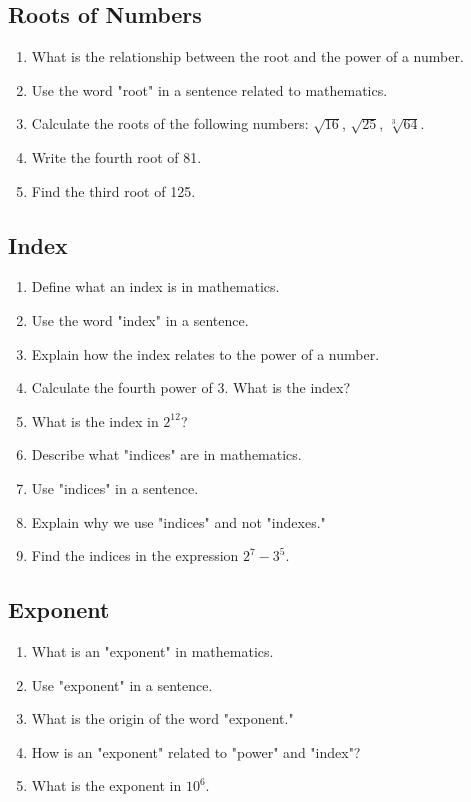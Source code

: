 \documentclass[12pt]{article}
\begin{document}
\begin{enumerate}
\subsection*{Roots of Numbers}
\begin{enumerate}
\item What is the relationship between the root and the power of a number.
\item Use the word "root" in a sentence related to mathematics.
\item Calculate the roots of the following numbers: $\sqrt{16}$, $\sqrt{25}$, $\sqrt[3]{64}$.
\item Write the fourth root of 81.
\item Find the third root of 125.
\end{enumerate}

\subsection*{Index}
\begin{enumerate}
\item Define what an index is in mathematics.
\item Use the word "index" in a sentence.
\item Explain how the index relates to the power of a number.
\item Calculate the fourth power of 3. What is the index?
\item What is the index in $2^{12}$?
\item Describe what "indices" are in mathematics.
\item Use "indices" in a sentence.
\item Explain why we use "indices" and not "indexes."
\item Find the indices in the expression $2^7 - 3^5$.
\end{enumerate}

\subsection*{Exponent}
\begin{enumerate}
\item What is an "exponent" in mathematics.
\item Use "exponent" in a sentence.
\item What is the origin of the word "exponent."
\item How is an "exponent" related to "power" and "index"?
\item What is the exponent in $10^6$.
\end{enumerate}


\end{enumerate}
\end{document}
